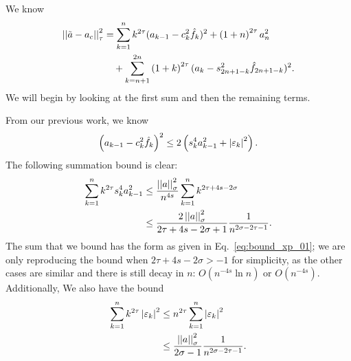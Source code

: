 We know
%
\begin{align}
    \left| \left| \tilde{a}-a_{c} \right| \right|_{\tau}^{2}
        &= \sum_{k=1}^{n}k^{2\tau}(a_{k-1} - c_{k}^{2}\hat{f}_{k})^{2}
            + \left( 1+n \right)^{2\tau}a_{n}^{2} \nonumber\\
            &\quad + \sum_{k=n+1}^{2n}\left( 1+k \right)^{2\tau}(a_{k}
                -s_{2n+1-k}^{2}\hat{f}_{2n+1-k})^{2}.
\end{align}
%
We will begin by looking at the first sum and then the remaining terms.

From our previous work, we know
%
\begin{equation}
    \left( a_{k-1}-c_{k}^{2}\hat{f}_{k} \right)^{2}
        \le 2\left( s_{k}^{4}a_{k-1}^{2} + \left| \varepsilon_{k} \right|^{2} \right).
\end{equation}
%
The following summation bound is clear:
%
\begin{align}
    \sum_{k=1}^{n}k^{2\tau}s_{k}^{4}a_{k-1}^{2}
        &\le \frac{\left| \left| a \right| \right|_{\sigma}^{2}}{n^{4s}}
        \sum_{k=1}^{n}k^{2\tau+4s-2\sigma} \nonumber\\
        &\le \frac{2\left| \left| a \right| \right|_{\sigma}^{2}}{2\tau+4s-2\sigma+1}
        \frac{1}{n^{2\sigma-2\tau-1}}.
    \label{eq:cvip_norm_conv_s_constraint_example_bound}
\end{align}
%
The sum that we bound has the form as given in Eq.~\eqref{eq:bound_xp_01};
we are only reproducing the bound when $2\tau+4s-2\sigma>-1$ for
simplicity, as the other cases are similar and there is still decay in $n$:
$O(n^{-4s}\ln n)$ or $O(n^{-4s})$.
Additionally, We also have the bound
%
\begin{align}
    \sum_{k=1}^{n}k^{2\tau}\left| \varepsilon_{k} \right|^{2}
        &\le n^{2\tau}\sum_{k=1}^{n}\left| \varepsilon_{k} \right|^{2} \nonumber\\
    &\le \frac{\left| \left| a \right| \right|_{\sigma}^{2}}{2\sigma-1}\frac{1}{
        n^{2\sigma-2\tau-1}}.
\end{align}

